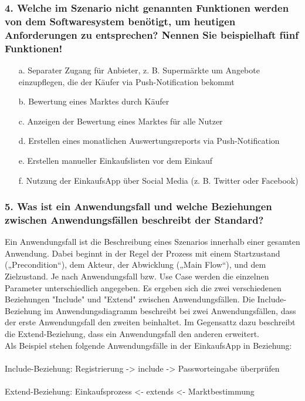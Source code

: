 \documentclass[12pt,a4paper]{article}
\begin{document}
\subsubsection*{4. Welche im Szenario nicht genannten Funktionen werden von dem Softwaresystem benötigt, um heutigen Anforderungen zu entsprechen? Nennen Sie beispielhaft fünf Funktionen!}
\begin{itemize}
\item[a.] Separater Zugang für Anbieter, z. B. Supermärkte um Angebote einzupflegen, die der Käufer via Push-Notification bekommt
\item[b.] Bewertung eines Marktes durch Käufer
\item[c.] Anzeigen der Bewertung eines Marktes für alle Nutzer
\item[d.] Erstellen eines monatlichen Auswertungsreports via Push-Notification 
\item[e.] Erstellen manueller Einkaufslisten vor dem Einkauf 
\item[f.] Nutzung der EinkaufsApp über Social Media (z. B. Twitter oder Facebook)
\end{itemize}
 
 
\subsubsection*{5. Was ist ein Anwendungsfall und welche Beziehungen zwischen Anwendungsfällen beschreibt der Standard?}
Ein Anwendungsfall ist die Beschreibung eines Szenarios innerhalb einer gesamten Anwendung. 
Dabei beginnt in der Regel der Prozess mit einem Startzustand („Precondition“), dem Akteur, der Abwicklung („Main Flow“), und dem Zielzustand. 
Je nach Anwendungsfall bzw. Use Case werden die einzelnen Parameter unterschiedlich angegeben. Es ergeben sich die zwei verschiedenen Beziehungen "Include" und "Extend" zwischen Anwendungsfällen.
Die Include-Beziehung im Anwendungsdiagramm beschreibt bei zwei Anwendungsfällen, dass der erste Anwendungsfall den zweiten beinhaltet. Im Gegensattz dazu beschreibt die Extend-Beziehung, dass ein Anwendungsfall den anderen erweitert.
\\
Als Beispiel stehen folgende Anwendungsfälle in der EinkaufsApp in Beziehung:
\\
\\
Include-Beziehung:
Registrierung -> include -> Passworteingabe überprüfen
\\
\\
Extend-Beziehung:
Einkaufsprozess <- extends <- Marktbestimmung
\\
\newpage
\end{document}
